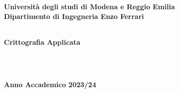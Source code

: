 \documentclass[12pt,a4paper,oneside,onecolumn,openright]{book}
\begin{document}
\begin{titlepage}
\begin{center}
{
    \large
    \textbf{Università  degli studi di Modena e Reggio Emilia} \\
   	\textbf{Dipartimento di Ingegneria Enzo Ferrari} \\
    \hspace*{0cm} \hrulefill \hspace*{0cm} \\
  
  
 		\huge{\bf Crittografia Applicata }}\\
		\vspace{3mm}
		
		\end{center}
		
\vspace{40mm}
\par
\noindent
\vspace{20mm}
\begin{center}
\hspace*{0cm} \hrulefill \hspace*{0cm} \\
{\large{\bf 
Anno Accademico 2023/24}}
\end{center}

\end{titlepage}

\pagestyle{frontmatter}
\frontmatter

\setcounter{tocdepth}{2}
\tableofcontents

\setlength{\parindent}{12pt}
\setlength{\parskip}{1ex plus 0.5ex minus 0.2ex}
\mainmatter
\pagestyle{mainmatter}












\begin{flushleft}

 
\end{flushleft}
\end{document}
